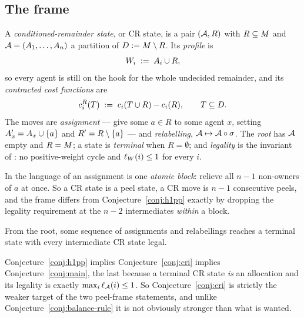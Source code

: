 \subsection{The frame}
\label{sec:cri-frame}

\begin{definition}[CR state]
\label{def:crstate}
A \emph{conditioned-remainder state}, or CR state, is a pair $(\mathcal{A}, R)$ with
$R \subseteq M$ and $\mathcal{A} = (A_{1},\dots,A_{n})$ a partition of
$D := M \setminus R$. Its \emph{profile} is
\[
  W_i \;:=\; A_{i} \cup R,
\]
so every agent is still on the hook for the whole undecided remainder, and its
\emph{contracted cost functions} are
\[
  c^{R}_i(T) \;:=\; c_i(T \cup R) - c_i(R),
  \qquad T \subseteq D .
\]
The moves are \emph{assignment} --- give some $a \in R$ to some agent $x$,
setting $A_{x}' = A_{x} \cup \left\{a\right\}$ and $R' = R \setminus \left\{a\right\}$
--- and \emph{relabelling}, $\mathcal{A} \mapsto \mathcal{A} \circ \sigma$. The
\emph{root} has $\mathcal{A}$ empty and $R = M$; a state is \emph{terminal} when
$R = \emptyset$; and \emph{legality} is the invariant of : no
positive-weight cycle and $\ell_{W}(i) \le 1$ for every $i$.
\end{definition}

In the language of  an assignment is one \emph{atomic block}:
relieve all $n-1$ non-owners of $a$ at once. So a CR state is a peel state, a CR
move is $n-1$ consecutive peels, and the frame differs from
Conjecture~\ref{conj:h1pp} exactly by dropping the legality requirement at the
$n-2$ intermediates \emph{within} a block.

\begin{conjecture}
\label{conj:cri}
From the root, some sequence of assignments and relabellings reaches a terminal
state with every intermediate CR state legal.
\end{conjecture}

Conjecture~\ref{conj:h1pp} implies Conjecture~\ref{conj:cri} implies
Conjecture~\ref{conj:main}, the last because a terminal CR state \emph{is} an
allocation and its legality is exactly $\max_i \ell_{\mathcal{A}}(i) \le 1$. So
Conjecture~\ref{conj:cri} is strictly the weaker target of the two peel-frame
statements, and unlike Conjecture~\ref{conj:balance-rule} it is not obviously
stronger than what is wanted.

